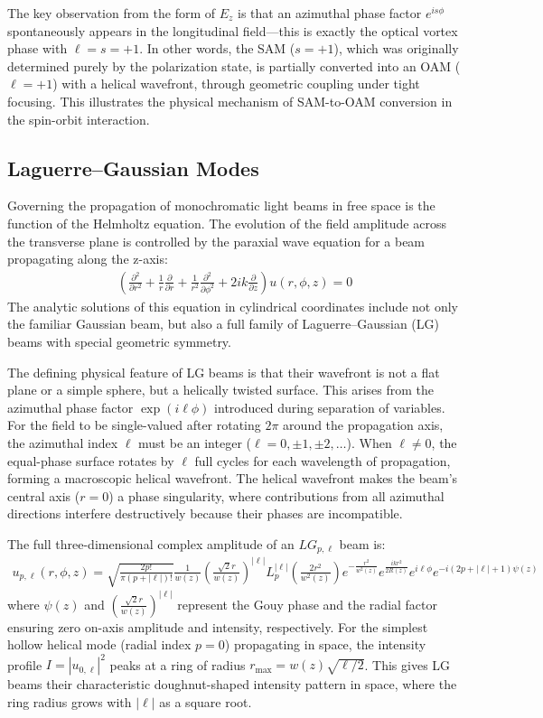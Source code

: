 The key observation from the form of $E_z$ is that an azimuthal phase factor $e^{is\phi}$ spontaneously appears in the longitudinal field—this is exactly the optical vortex phase with $\ell = s = +1$. In other words, the SAM ($s = +1$), which was originally determined purely by the polarization state, is partially converted into an OAM ($\ell = +1$) with a helical wavefront, through geometric coupling under tight focusing. This illustrates the physical mechanism of SAM-to-OAM conversion in the spin-orbit interaction.

\subsection{Laguerre--Gaussian Modes}  
\label{sec:lg}
Governing the propagation of monochromatic light beams in free space is the function of the Helmholtz equation. The evolution of the field amplitude across the transverse plane is controlled by the paraxial wave equation for a beam propagating along the z-axis:
\begin{align}
\left( \frac{\partial^2}{\partial r^2} + \frac{1}{r}\frac{\partial}{\partial r} + \frac{1}{r^2}\frac{\partial^2}{\partial \phi^2} + 2ik\frac{\partial}{\partial z} \right) u(r,\phi,z) = 0
\end{align}
The analytic solutions of this equation in cylindrical coordinates include not only the familiar Gaussian beam, but also a full family of Laguerre--Gaussian (LG) beams with special geometric symmetry.

The defining physical feature of LG beams is that their wavefront is not a flat plane or a simple sphere, but a helically twisted surface. This arises from the azimuthal phase factor $\exp(i\ell\phi)$ introduced during separation of variables. For the field to be single-valued after rotating $2\pi$ around the propagation axis, the azimuthal index $\ell$ must be an integer ($\ell = 0, \pm 1, \pm 2, \dots$). When $\ell \neq 0$, the equal-phase surface rotates by $\ell$ full cycles for each wavelength of propagation, forming a macroscopic helical wavefront. The helical wavefront makes the beam's central axis ($r=0$) a phase singularity, where contributions from all azimuthal directions interfere destructively because their phases are incompatible.

The full three-dimensional complex amplitude of an $LG_{p,\ell}$ beam is:
\begin{align}
u_{p,\ell}(r, \phi, z) = \sqrt{\frac{2p!}{\pi(p+|\ell|)!}} \frac{1}{w(z)} \left( \frac{\sqrt{2}r}{w(z)} \right)^{|\ell|} L_p^{|\ell|}\left( \frac{2r^2}{w^2(z)} \right) e^{ -\frac{r^2}{w^2(z)}} e^{ \frac{ikr^2}{2R(z)}} e^{i\ell\phi} e^{-i(2p+|\ell|+1)\psi(z)}
\end{align}
where $\psi(z)$ and $\left(\frac{\sqrt{2}r}{w(z)}\right)^{\vert{}\ell\vert{}}$ represent the Gouy phase and the radial factor ensuring zero on-axis amplitude and intensity, respectively. For the simplest hollow helical mode (radial index $p=0$) propagating in space, the intensity profile $I = |u_{0,\ell}|^2$ peaks at a ring of radius $r_{\text{max}} = w(z)\sqrt{\ell/2}$. This gives LG beams their characteristic doughnut-shaped intensity pattern in space, where the ring radius grows with $|\ell|$ as a square root.

